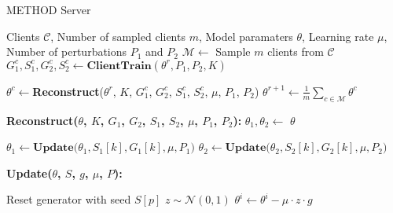\begin{algorithm}[tb]

\caption{\ac{METHOD} Server}
\begin{algorithmic}[1] 
\REQUIRE Clients $\mathcal{C}$, Number of sampled clients $m$, Model paramaters $\theta$, Learning rate $\mu$, Number of perturbations $P_{1}$ and $P_{2}$  
    \STATE $\mathcal{M} \gets$ Sample $m$ clients from $\mathcal{C}$
        \STATE $G_{1}^{c}, S_{1}^{c}, G_{2}^{c}, S_{2}^{c} \gets \textbf{ClientTrain} (\theta^{r}, P_{1}, P_{2}, K)$  %
    \ENDFOR
    
        \STATE $\theta^{c} \gets $\textbf{Reconstruct}($\theta^{r}$, $K$, $G^{c}_{1}$, $G^{c}_{2}$, $S^{c}_{1}$, $S^{c}_{2}$, $\mu$, $P_{1}$, $P_{2}$)
    \ENDFOR
    \STATE $\theta^{r+1} \gets \frac{1}{m} \sum_{c \in \mathcal{M}}  \theta^{c}$
\ENDFOR

\STATE
\STATE \textbf{Reconstruct($\theta$, $K$, $G_{1}$, $G_{2}$, $S_{1}$, $S_{2}$, $\mu$, $P_{1}$, $P_{2}$):}
\STATE $\theta_{1}, \theta_{2} \gets$  $\theta$

    \STATE $\theta_{1} \gets \textbf{Update($\theta_{1}, S_{1}[k], G_{1}[k], \mu, P_{1}$)}$ 
   \STATE $\theta_{2} \gets \textbf{Update($\theta_{2}, S_{2}[k], G_{2}[k], \mu, P_{2}$)}$
\ENDFOR

    
\STATE
\STATE \textbf{Update($\theta$, $S$, $g$, $\mu$, $P$):} 

    \STATE Reset generator with seed $S[p]$
        \STATE \hspace{1em} $z \sim \mathcal{N}(0, 1)$
        \STATE \hspace{1em} $\theta^{i} \gets \theta^{i} - \mu \cdot z \cdot g$
    \ENDFOR
\ENDFOR
    









\end{algorithmic}
\label{alg:fl_server}
\end{algorithm}

\begin{comment}
     \STATE $\nabla L(\theta^k) = 0$ \COMMENT{$|\theta|$}
    \FOR {$p$ in $P$}
    \STATE Set seed generator to $S[k][p]$
    \STATE  Sample $z$
    \STATE $\nabla L(\theta)$ += $z/P * G[k]$ 
    \ENDFOR
    \STATE $\theta^{k+1} \gets \theta^k - \mu \nabla L(\theta^k)$
\end{comment}